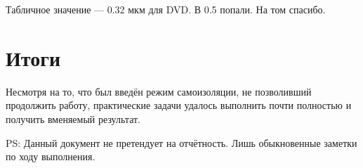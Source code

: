 \documentclass[titlepage, a4paper,12pt]{article}
\begin{document}
	Табличное значение --- 0.32 мкм для DVD. В 0.5 попали. На том спасибо.
	
	\section{Итоги}
	
	Несмотря на то, что был введён режим самоизоляции, не позволивший продолжить работу, практические задачи удалось выполнить почти полностью и получить вменяемый результат.
	
	PS: Данный документ не претендует на отчётность. Лишь обыкновенные заметки по ходу выполнения.
	
\end{document}
